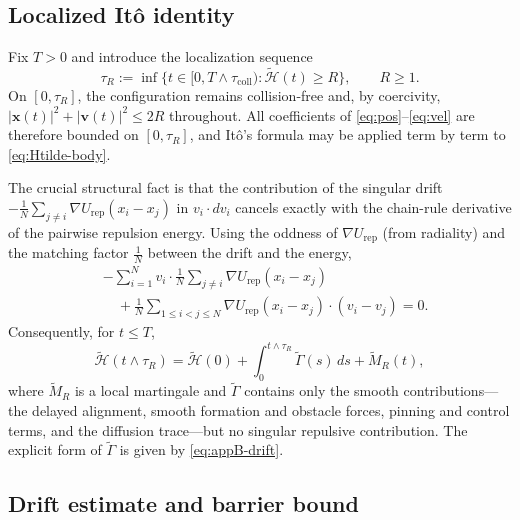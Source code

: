 \documentclass[pdflatex,sn-mathphys-num]{sn-jnl}%
\numberwithin{equation}{section}
\theoremstyle{thmstyleone}%
\theoremstyle{remark}
\theoremstyle{definition}
\begin{document}
\subsection{Localized It\^o identity}
\label{subsec:augmented-ito}

Fix $T>0$ and introduce the localization sequence
\begin{equation}\label{eq:tauR-body}
  \tau_R := \inf\{t\in[0,T\wedge\tau_{\mathrm{coll}}) :
    \widetilde{\mathscr H}(t)\ge R\}, \qquad R\ge 1.
\end{equation}
On $[0,\tau_R]$, the configuration remains collision-free and, by
coercivity, $|\mathbf{x}(t)|^2+|\mathbf{v}(t)|^2 \le 2R$ throughout. All coefficients of
\eqref{eq:pos}--\eqref{eq:vel} are therefore bounded on $[0,\tau_R]$, and
It\^o's formula may be applied term by term to \eqref{eq:Htilde-body}.

The crucial structural fact is that the contribution of the singular drift
$-\frac{1}{N}\sum_{j\neq i}\nabla U_{\mathrm{rep}}(x_i-x_j)$ in
$v_i\cdot dv_i$ cancels exactly with the chain-rule derivative of the
pairwise repulsion energy. Using the oddness of $\nabla U_{\mathrm{rep}}$
(from radiality) and the matching factor $\frac{1}{N}$ between the drift
and the energy,
\begin{equation}\label{eq:singular-cancel}
\begin{aligned}
  &-\sum_{i=1}^{N} v_i\cdot\frac{1}{N}\sum_{j\neq i}\nabla U_{\mathrm{rep}}(x_i-x_j) \\
  &\quad+ \frac{1}{N}\sum_{1\le i<j\le N}\nabla U_{\mathrm{rep}}(x_i-x_j)\cdot(v_i-v_j) = 0.
\end{aligned}
\end{equation}
Consequently, for $t\le T$,
\begin{equation}\label{eq:Htilde-ito-body}
  \widetilde{\mathscr H}(t\wedge\tau_R)
  = \widetilde{\mathscr H}(0)
  + \int_0^{t\wedge\tau_R}\widetilde{\Gamma}(s)\,ds
  + \widetilde{M}_R(t),
\end{equation}
where $\widetilde{M}_R$ is a local martingale and $\widetilde{\Gamma}$
contains only the smooth contributions---the delayed alignment, smooth
formation and obstacle forces, pinning and control terms, and the diffusion
trace---but no singular repulsive contribution. The explicit form of
$\widetilde{\Gamma}$ is given by \eqref{eq:appB-drift}.

\subsection{Drift estimate and barrier bound}
\label{subsec:augmented-drift-bound}
\end{document}
